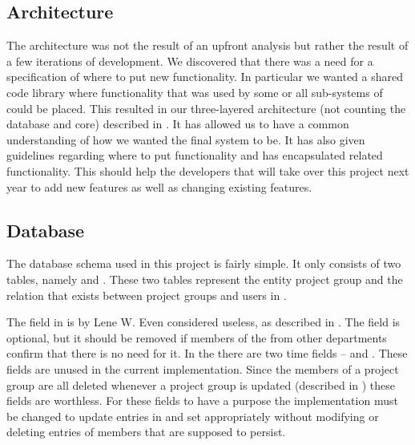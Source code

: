 \subsection{Architecture}



The architecture was not the result of an upfront analysis but rather the result of a few iterations of development.
We discovered that there was a need for a specification of where to put new functionality.
In particular we wanted a shared code library where functionality that was used by some or all sub-systems of \system{} could be placed.
This resulted in our three-layered architecture (not counting the database and \moodle{} core) described in .
It has allowed us to have a common understanding of how we wanted the final system to be.
It has also given guidelines regarding where to put functionality and has encapsulated related functionality.
This should help the developers that will take over this project next year to add new features as well as changing existing features.



\subsection{Database}
The database schema used in this project is fairly simple.
It only consists of two tables, namely   and . 
These two tables represent the entity project group and the relation that exists between project groups and users in \moodle{}. 

The  field in  is by Lene W. Even considered useless, as described in . 
The field is optional, but it should be removed if members of the \admpers{} from other departments confirm that there is no need for it. 
In the  there are two time fields --  and . 
These fields are unused in the current implementation. 
Since the members of a project group are all deleted whenever a project group is updated (described in ) these fields are worthless.
For these fields to have a purpose the implementation must be changed to update entries in  and set  appropriately without modifying  or deleting entries of members that are supposed to persist.


